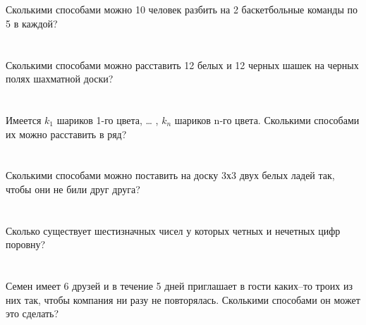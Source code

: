 \documentclass{article}%
\begin{document}
%
\section{}%
\label{sec:}%
Сколькими способами можно 10 человек разбить на 2 баскетбольные команды
по 5 в каждой?%
%
\iffalse%
Автор: 25 школа%
Дата: 01{-}07{-}2017%
Название: None%
Подсказка: \textbackslash{}\textbackslash{}%
nan%
\fi

%
\section{}%
\label{sec:}%
Сколькими способами можно расставить 12 белых и 12 черных шашек на черных
полях шахматной доски?%
%
\iffalse%
Автор: 25 школа%
Дата: 01{-}07{-}2017%
Название: None%
Подсказка: \textbackslash{}\textbackslash{}%
nan%
\fi

%
\section{}%
\label{sec:}%
Имеется $k_1$ шариков 1-го цвета, … , $k_n$ шариков n-го цвета. Сколькими способами их можно расставить в ряд?%
%
\iffalse%
Автор: Ираклий Гагуа%
Дата: 07{-}01{-}2011%
Название: None%
Подсказка: \textbackslash{}\textbackslash{}%
nan%
\fi

%
\section{}%
\label{sec:}%
Сколькими способами можно поставить на доску 3х3 двух белых ладей так, чтобы они не били друг друга?%
%
\iffalse%
Автор: Ираклий Гагуа%
Дата: 07{-}01{-}2011%
Название: None%
Подсказка: \textbackslash{}\textbackslash{}%
nan%
\fi

%
\section{}%
\label{sec:}%
Сколько существует шестизначных чисел у которых четных и нечетных цифр
поровну?%
%
\iffalse%
Автор: 25 школа%
Дата: 01{-}07{-}2017%
Название: None%
Подсказка: \textbackslash{}\textbackslash{}%
nan%
\fi

%
\section{}%
\label{sec:}%
Семен имеет 6 друзей и в течение 5 дней приглашает в гости каких–то троих
из них так, чтобы компания ни разу не повторялась. Сколькими способами он может
это сделать?%
%
\iffalse%
Автор: 25 школа%
Дата: 01{-}07{-}2017%
Название: None%
Подсказка: \textbackslash{}\textbackslash{}%
nan%
\fi
\end{document}
